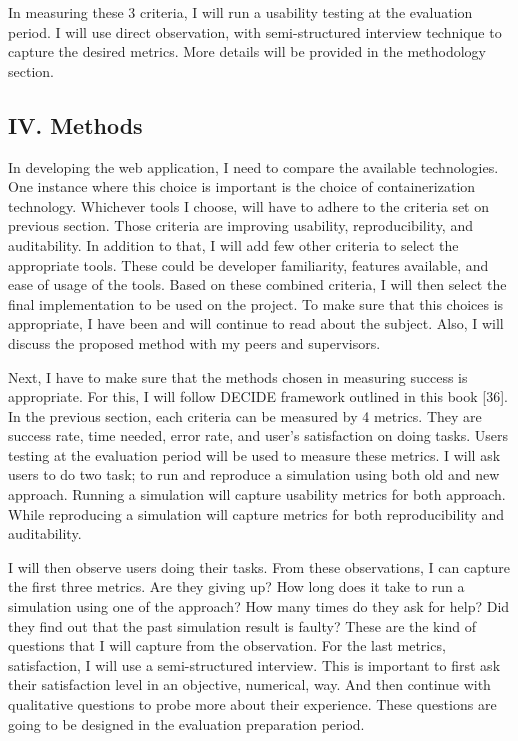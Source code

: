 \documentclass[]{article}
\begin{document}
In measuring these 3 criteria, I will run a usability testing at the
evaluation period. I will use direct observation, with semi-structured
interview technique to capture the desired metrics. More details will be
provided in the methodology section.

\subsection{IV. Methods}\label{iv.-methods}

In developing the web application, I need to compare the available
technologies. One instance where this choice is important is the choice
of containerization technology. Whichever tools I choose, will have to
adhere to the criteria set on previous section. Those criteria are
improving usability, reproducibility, and auditability. In addition to
that, I will add few other criteria to select the appropriate tools.
These could be developer familiarity, features available, and ease of
usage of the tools. Based on these combined criteria, I will then select
the final implementation to be used on the project. To make sure that
this choices is appropriate, I have been and will continue to read about
the subject. Also, I will discuss the proposed method with my peers and
supervisors.

Next, I have to make sure that the methods chosen in measuring success
is appropriate. For this, I will follow DECIDE framework outlined in
this book {[}36{]}. In the previous section, each criteria can be
measured by 4 metrics. They are success rate, time needed, error rate,
and user's satisfaction on doing tasks. Users testing at the evaluation
period will be used to measure these metrics. I will ask users to do two
task; to run and reproduce a simulation using both old and new approach.
Running a simulation will capture usability metrics for both approach.
While reproducing a simulation will capture metrics for both
reproducibility and auditability.

I will then observe users doing their tasks. From these observations, I
can capture the first three metrics. Are they giving up? How long does
it take to run a simulation using one of the approach? How many times do
they ask for help? Did they find out that the past simulation result is
faulty? These are the kind of questions that I will capture from the
observation. For the last metrics, satisfaction, I will use a
semi-structured interview. This is important to first ask their
satisfaction level in an objective, numerical, way. And then continue
with qualitative questions to probe more about their experience. These
questions are going to be designed in the evaluation preparation period.
\end{document}
